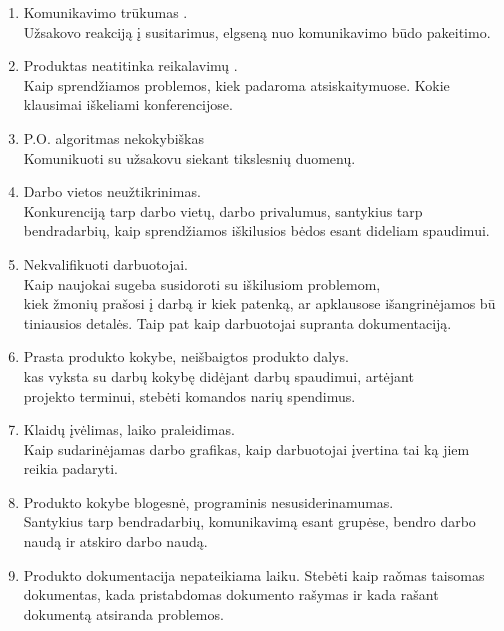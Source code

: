 \documentclass[a4paper,12pt]{article}
\begin{document}
\begin{enumerate}
	\item Komunikavimo tr\= ukumas . \\
 		U\v zsakovo reakcij\k a \k i susitarimus, elgsen\k a nuo komunikavimo b\= udo pakeitimo. 
  		
	\item Produktas neatitinka reikalavim\k u . \\
		Kaip sprend\v ziamos problemos, kiek padaroma atsiskaitymuose. Kokie klausimai i\v skeliami konferencijose.
		
	\item P.O. algoritmas nekokybiškas\\
  	Komunikuoti su užsakovu siekant tikslesnių duomenų.\\
  	
		
	\item Darbo vietos neu\v ztikrinimas.\\
  		Konkurencij\k a tarp darbo viet\k u, darbo privalumus, santykius tarp bendradarbi\k u,
  		kaip sprend\v ziamos i\v skilusios b\. edos esant dideliam spaudimui.
  		
	\item Nekvalifikuoti darbuotojai. \\
  		Kaip naujokai sugeba susidoroti su i\v skilusiom problemom, \\ kiek \v zmoni\k u
  		pra\v sosi \k i darb\k a ir kiek patenk\k a, ar apklausose i\v sangrin\. ejamos
  		b\= u tiniausios detal\. es. Taip pat kaip  darbuotojai supranta dokumentacij\k a.

	\item Prasta produkto kokybe, nei\v sbaigtos produkto dalys.\\
		kas vyksta su darb\k u kokyb\k e did\. ejant darb\k u spaudimui, art\. ejant \\
		projekto terminui, steb\. eti komandos nari\k u spendimus.
  		
	\item Klaid\k u \k iv\. elimas, laiko praleidimas.\\
  		Kaip sudarin\. ejamas darbo grafikas, kaip darbuotojai \k ivertina tai k\k a jiem
  		reikia padaryti.
  		
	\item Produkto kokybe blogesn\. e,	programinis nesusiderinamumas. \\ 
  		Santykius tarp bendradarbi\k u, komunikavim\k a esant grup\. ese, bendro darbo 
  		naud\k a ir atskiro darbo naud\k a.
  		
	\item Produkto dokumentacija nepateikiama laiku.
  		Steb\. eti kaip ra\v omas taisomas dokumentas, kada pristabdomas dokumento ra\v symas
  		ir kada ra\v sant dokument\k a atsiranda problemos.

	
  		
\end{enumerate}
\end{document}
